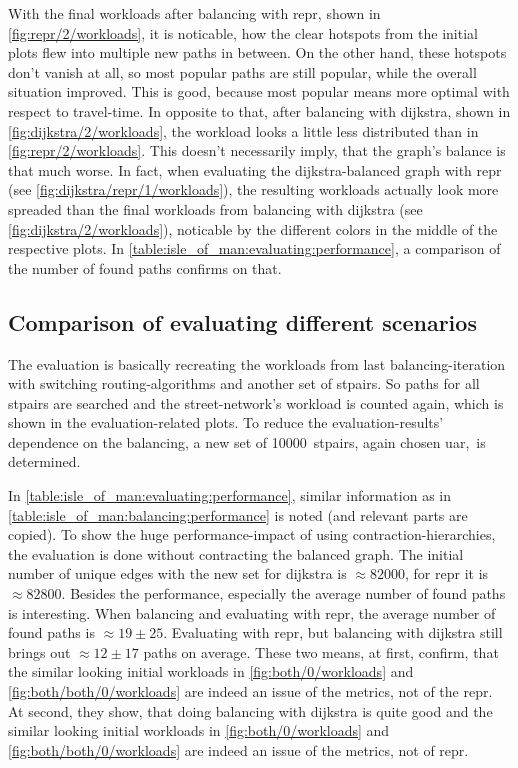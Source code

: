         With the final workloads after \gls{balancing} with \gls{repr}, shown in \vref{fig:repr/2/workloads}, it is noticable, how the clear hotspots from the initial plots flew into multiple new paths in between.
        On the other hand, these hotspots don't vanish at all, so most popular paths are still popular, while the overall situation improved.
        This is good, because most popular means more optimal with respect to travel-time.
        In opposite to that, after \gls{balancing} with \gls{dijkstra}, shown in \cref{fig:dijkstra/2/workloads}, the workload looks a little less distributed than in \cref{fig:repr/2/workloads}.
        This doesn't necessarily imply, that the graph's balance is that much worse.
        In fact, when evaluating the \gls{dijkstra}-balanced graph with \gls{repr} (see \vref{fig:dijkstra/repr/1/workloads}), the resulting workloads actually look more spreaded than the final workloads from \gls{balancing} with \gls{dijkstra} (see \cref{fig:dijkstra/2/workloads}), noticable by the different colors in the middle of the respective plots.
        In \vref{table:isle_of_man:evaluating:performance}, a comparison of the number of found paths confirms on that.

    \subsection{Comparison of evaluating different scenarios}

        The evaluation is basically recreating the workloads from last \gls{balancing}-iteration with switching routing-algorithms and another set of \glspl{stpair}.
        So paths for all \glspl{stpair} are searched and the street-network's workload is counted again, which is shown in the evaluation-related plots.
        To reduce the evaluation-results' dependence on the \gls{balancing}, a new set of \num{10000}~\glspl{stpair}, again chosen \gls{uar},\ is determined.

        In \vref{table:isle_of_man:evaluating:performance}, similar information as in \vref{table:isle_of_man:balancing:performance} is noted (and relevant parts are copied).
        To show the huge performance-impact of using \gls{contraction-hierarchies}, the evaluation is done without contracting the balanced graph.
        The initial number of unique edges with the new set for \gls{dijkstra} is $\approx \num{82000}$, for \gls{repr} it is $\approx \num{82800}$.
        Besides the performance, especially the average number of found paths is interesting.
        When \gls{balancing} and evaluating with \gls{repr}, the average number of found paths is $\approx 19 \pm 25$.
        Evaluating with \gls{repr}, but \gls{balancing} with \gls{dijkstra} still brings out $\approx 12 \pm 17$ paths on average.
        These two means, at first, confirm, that the similar looking initial workloads in \vref{fig:both/0/workloads} and \vref{fig:both/both/0/workloads} are indeed an issue of the \glspl{metric}, not of the \gls{repr}.
        At second, they show, that doing \gls{balancing} with \gls{dijkstra} is quite good and the similar looking initial workloads in \vref{fig:both/0/workloads} and \vref{fig:both/both/0/workloads} are indeed an issue of the \glspl{metric}, not of \gls{repr}.

